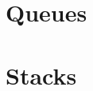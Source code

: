 \documentclass[11pt,a4paper]{article}
\author{Christian Rinderknecht}
\date{16 October 2006}
\begin{document}
\maketitle

\thispagestyle{empty}

\section{Queues}



\section{Stacks}



\end{document}

